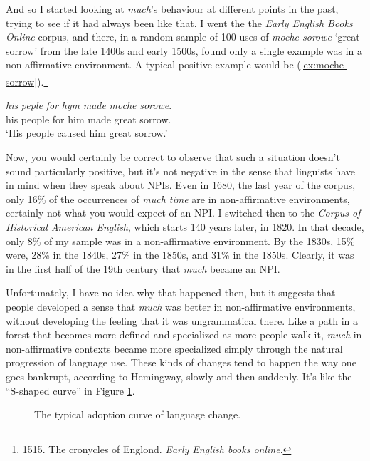 And so I started looking at \textit{much}'s behaviour at different points in the past, trying to see if it had always been like that. I went the the \textit{Early English Books Online} corpus, and there, in a random sample of 100 uses of \textit{moche sorowe} `great sorrow' from the late 1400s and early 1500s, found only a single example was in a non-affirmative environment. A typical positive example would be (\ref{ex:moche-sorrow}).\footnote{1515. The cronycles of Englond. \textit{Early English books online}.}

\ea \label{ex:moche-sorrow}
    \gll \textit{his} \textit{peple} \textit{for} \textit{hym} \textit{made} \textit{moche} \textit{sorowe}. \\ his people for him made great sorrow.\\
    \trans `His people caused him great sorrow.'
\z

Now, you would certainly be correct to observe that such a situation doesn't sound particularly positive, but it's not negative in the sense that linguists have in mind when they speak about NPIs. Even in 1680, the last year of the corpus, only 16\% of the occurrences of \textit{much time} are in non-affirmative environments, certainly not what you would expect of an NPI. I switched then to the \textit{Corpus of Historical American English}, which starts 140 years later, in 1820. In that decade, only 8\% of my sample was in a non-affirmative environment. By the 1830s, 15\% were, 28\% in the 1840s, 27\% in the 1850s, and 31\% in the 1850s. Clearly, it was in the first half of the 19th century that \textit{much} became an NPI.

Unfortunately, I have no idea why that happened then, but it suggests that people developed a sense that \textit{much} was better in non-affirmative environments, without developing the feeling that it was ungrammatical there. Like a path in a forest that becomes more defined and specialized as more people walk it, \textit{much} in non-affirmative contexts became more specialized simply through the natural progression of language use. These kinds of changes tend to happen the way one goes bankrupt, according to Hemingway, slowly and then suddenly. It's like the ``S-shaped curve'' in Figure \ref{fig:sigmoid-function}.

\begin{figure}
    \centering
    \caption{The typical adoption curve of language change.}
    \label{fig:sigmoid-function}
\end{figure}

